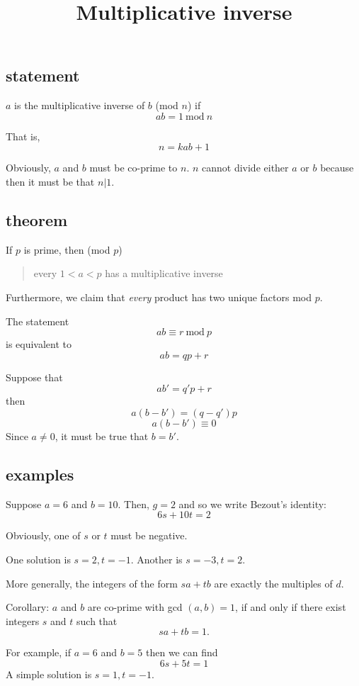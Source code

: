 \documentclass[11pt, oneside]{article}
\title{Multiplicative inverse}
\date{}
\begin{document}
\maketitle
\Large

\subsection*{statement}

$a$ is the multiplicative inverse of $b$ (mod $n$) if
\[ ab = 1 \ \text{mod} \ n \]

That is, 
\[ n = kab + 1 \]

Obviously, $a$ and $b$ must be co-prime to $n$.  $n$ cannot divide either $a$ or $b$ because then it must be that $n | 1$.

\subsection*{theorem}

If $p$ is prime, then (mod $p$)
\begin{quote} every $1 < a < p$ has a multiplicative inverse\end{quote}

Furthermore, we claim that \emph{every} product has two unique factors mod $p$.

The statement
\[ ab \equiv r \ \text{mod} \ p \]
is equivalent to
\[ ab = qp + r \]

Suppose that 
\[ ab' = q'p + r \]
then
\[ a(b - b') = (q - q')p \]
\[ a(b - b') \equiv 0 \]
Since $a \ne 0$, it must be true that $b = b'$.

\subsection*{examples}

Suppose $a = 6$ and $b = 10$.  Then, $g = 2$ and so we write Bezout's identity:
\[ 6s + 10t = 2 \]
    
Obviously, one of $s$ or $t$ must be negative.  

One solution is $s = 2, t = -1$.  Another is $s = -3, t = 2$.  

More generally, the integers of the form $sa + tb$ are exactly the multiples of $d$.

Corollary:  $a$ and $b$ are co-prime with gcd $(a,b) = 1$, if and only if there exist integers $s$ and $t$ such that
\[ sa + tb = 1. \]

For example, if $a = 6$ and $b = 5$ then we can find
\[ 6s + 5t = 1 \]
A simple solution is $s = 1, t = -1$.
\end{document}
